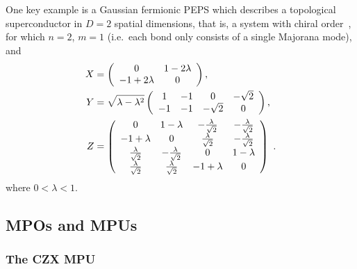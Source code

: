 \documentclass[rmp,aps,reprint,superscriptaddress,nobalancelastpage]{revtex4-1}
\let\endignorethis\relax
\def\TOCstop{\addtocontents{toc}{\ignorethis}}
\def\TOCstart{\addtocontents{toc}{\endignorethis}}
\begin{document}
One key example is a Gaussian fermionic PEPS which describes a topological superconductor in $D=2$ spatial dimensions, that is, a system with chiral order~\cite{wahl:chiral-fPEPS,wahl:chiral-boundaries}, for which
$n=2$, $m=1$ (i.e.\ each bond only consists of a single Majorana mode), and
\begin{align*}
    X & = \left(\begin{array}{cc}
                        0           & 1-2\lambda \\
                        -1+2\lambda & 0
                    \end{array}\right), \notag                                                                                               \\
    Y & =  \sqrt{\lambda - \lambda^2}\left(\begin{array}{cccc}
                                                   1  & -1 & 0         & -\sqrt{2} \\
                                                   -1 & -1 & -\sqrt{2} & 0
                                               \end{array}\right), \notag                                                               \\
    Z & = \left(\begin{array}{cccc}
                        0                       & 1-\lambda                & -\frac{\lambda}{\sqrt 2} & -\frac{\lambda}{\sqrt{2}} \\
                        -1+\lambda              & 0                        & \frac{\lambda}{\sqrt 2}  & -\frac{\lambda}{\sqrt{2}} \\
                        \frac{\lambda}{\sqrt 2} & -\frac{\lambda}{\sqrt 2} & 0                        & 1-\lambda                 \\
                        \frac{\lambda}{\sqrt 2} & \frac{\lambda}{\sqrt 2}  & -1+\lambda               & 0
                    \end{array}\right) \ .
\end{align*}
where $0<\lambda<1$.




\TOCstart
\subsection{MPOs and MPUs\label{sec:app-examples:mpo-mpu}}
\TOCstop

\subsubsection{The CZX MPU}
\end{document}
